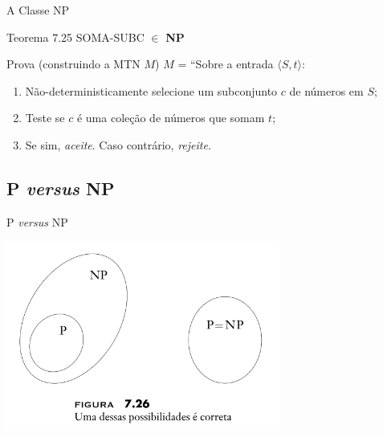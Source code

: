 \documentclass[xcolor=dvipsnames,table]{beamer}
\begin{document}
	\begin{frame}{A Classe NP}
		\begin{block}{Teorema 7.25}
			SOMA-SUBC $\in$ {\bf NP}
		\end{block} \pause
		\begin{block}{Prova (construindo a MTN $M$)}
			$M$ = ``Sobre a entrada $\langle S, t \rangle$:
			\begin{enumerate}
				\item Não-deterministicamente selecione um subconjunto $c$ de números em $S$;
				\item Teste se $c$ é uma coleção de números que somam $t$;
				\item Se sim, {\it aceite}. Caso contrário, {\it rejeite}.
			\end{enumerate}
		\end{block}
	\end{frame}
	
	\subsection{P {\it versus} NP}
	\begin{frame}{P {\it versus} NP}
		\begin{center}
			\includegraphics[width=9cm]{images/pNp.png}
		\end{center}
	\end{frame}	
	
	\begin{frame}
		\titlepage
	\end{frame}
	
\end{document}
